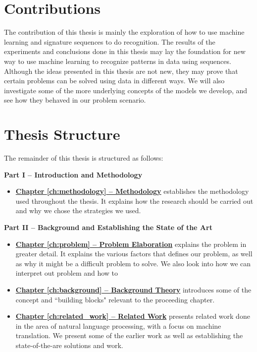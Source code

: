 
\section{Contributions}
\label{sec:contributions}
The contribution of this thesis is mainly the exploration of how to use machine learning and signature sequences to do recognition. The results of the experiments and conclusions done in this thesis may lay the foundation for new way to use machine learning to recognize patterns in data using sequences. Although the ideas presented in this thesis are not new, they may prove that certain problems can be solved using data in different ways. We will also investigate some of the more underlying concepts of the models we develop, and see how they behaved in our problem scenario.


\section{Thesis Structure}
The remainder of this thesis is structured as follows:

\vspace{0.5cm}\noindent
\begin{minipage}{\linewidth}
    \textbf{Part I -- Introduction and Methodology}
    \begin{itemize}
        \item\textbf{\hyperref[ch:methodology]{Chapter \ref{ch:methodology} -- Methodology}} establishes the methodology used throughout the thesis. It explains how the research should be carried out and why we chose the strategies we used.
    \end{itemize}
\end{minipage}

\vspace{0.5cm}\noindent
\begin{minipage}{\linewidth}
    \textbf{Part II -- Background and Establishing the State of the Art}
    \begin{itemize}
        \item\textbf{\hyperref[ch:problem]{Chapter \ref{ch:problem} -- Problem Elaboration}} explains the problem in greater detail. It explains the various factors that defines our problem, as well as why it might be a difficult problem to solve. We also look into how we can interpret out problem and how to 
        \item\textbf{\hyperref[ch:background]{Chapter \ref{ch:background} -- Background Theory}} introduces some of the concept and ``building blocks" relevant to the proceeding chapter.
        \item\textbf{\hyperref[ch:related_work]{Chapter \ref{ch:related_work} -- Related Work}} presents related work done in the area of natural language processing, with a focus on machine translation. We present some of the earlier work as well as establishing the state-of-the-are solutions and work.
    \end{itemize}
\end{minipage}

